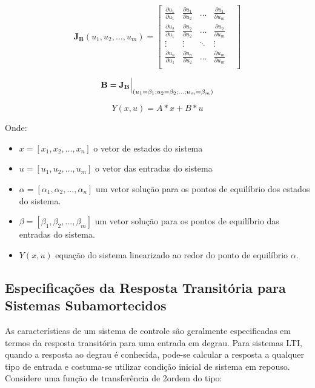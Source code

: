 \begin{equation} \label{eq:Jacobian_B}
    \mathbf{J_B}(u_1,u_2,\dots,u_m) =
    \begin{bmatrix}
        \frac{\partial u_1}{\partial u_1} & 
        \frac{\partial u_1}{\partial u_2} & 
        \dots &
        \frac{\partial u_1}{\partial u_m} &\\[1ex]
        \frac{\partial u_2}{\partial u_1} & 
        \frac{\partial u_2}{\partial u_2} & 
        \dots &
        \frac{\partial u_2}{\partial u_m} &\\[1ex]
        \vdots & 
        \vdots & 
        \ddots &
        \vdots &\\[1ex]
        \frac{\partial u_n}{\partial u_1} & 
        \frac{\partial u_n}{\partial u_2} & 
        \dots &
        \frac{\partial u_m}{\partial u_m} &\\[1ex]
    \end{bmatrix}
\end{equation}
    
\begin{equation} \label{eq:eval_B}
    \mathbf{B=J_B} \Bigr\rvert_{(u_1=\beta_1;u_2=\beta_2;\dots;u_m=\beta_m)} \\
\end{equation}
    
\begin{equation} \label{eq:sis_lenearizado}
    Y(x,u) = A*x + B*u
\end{equation}
    
Onde:
\begin{itemize}
    \item $x=[x_1,x_2,\dots,x_n]$ o vetor de estados do sistema
    \item $u=[u_1,u_2,\dots,u_m]$ o vetor das entradas do sistema
    \item $\alpha=[\alpha_1,\alpha_2,\dots,\alpha_n]$ um vetor solução para os pontos de equilíbrio dos estados do sistema.
    \item $\beta=[\beta_1,\beta_2,\dots,\beta_m]$ um vetor solução para os pontos de equilíbrio das entradas do sistema.
    \item $Y(x,u)$ equação do sistema linearizado ao redor do ponto de equilíbrio $\alpha$.
\end{itemize}
     
\subsection{Especificações da Resposta Transitória para Sistemas Subamortecidos}
As características de um sistema de controle são geralmente especificadas em termos da resposta transitória para uma entrada em degrau. Para sistemas LTI, quando a resposta ao degrau é conhecida, pode-se calcular a resposta a qualquer tipo de entrada e costuma-se utilizar condição inicial de sistema em repouso. 
Considere uma função de transferência de 2\textdegree ordem do tipo:

